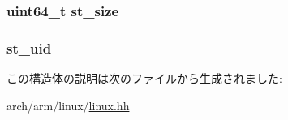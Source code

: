 \label{structArmLinux64_1_1tgt__stat_ac430407fd3b0e421da1ee8f66c95a786}
\hypertarget{structArmLinux64_1_1tgt__stat_ae9a97f03571901a066d512b87bc36dba}{
\subsubsection[{st\_\-size}]{\setlength{\rightskip}{0pt plus 5cm}uint64\_\-t {\bf st\_\-size}}}
\label{structArmLinux64_1_1tgt__stat_ae9a97f03571901a066d512b87bc36dba}
\hypertarget{structArmLinux64_1_1tgt__stat_ad5477a292a4edf27aa5766e01e0f5d1f}{
\subsubsection[{st\_\-uid}]{ {\bf st\_\-uid}}}
\label{structArmLinux64_1_1tgt__stat_ad5477a292a4edf27aa5766e01e0f5d1f}


この構造体の説明は次のファイルから生成されました:\begin{DoxyCompactItemize}
\item 
arch/arm/linux/\hyperlink{arch_2arm_2linux_2linux_8hh}{linux.hh}\end{DoxyCompactItemize}
